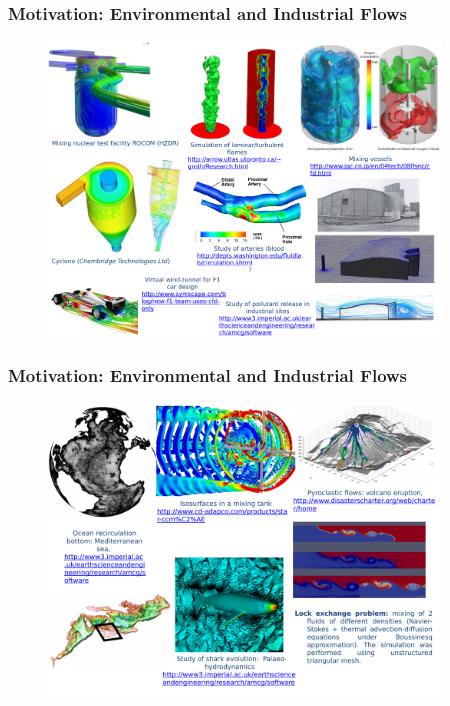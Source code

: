 \documentclass[10pt,compress, unknownkeysallowed]{beamer}
\begin{document}
\begin{frame}
 \frametitle{Motivation: Environmental and Industrial Flows}

   \begin{figure}%
    \begin{center}
     \includegraphics[width=12.cm, height=7.8cm, clip]{./Figs/SpecificIndustrialEnvironmentalApplication2}
    \end{center}
   \end{figure}    
\end{frame}
 
\begin{frame}
 \frametitle{Motivation: Environmental and Industrial Flows}

   \begin{figure}%
    \begin{center}
     \includegraphics[width=12.cm, height=7.8cm, clip]{./Figs/PostProcessingExamples2.pdf}
    \end{center}
   \end{figure}    
\end{frame}
\end{document}
